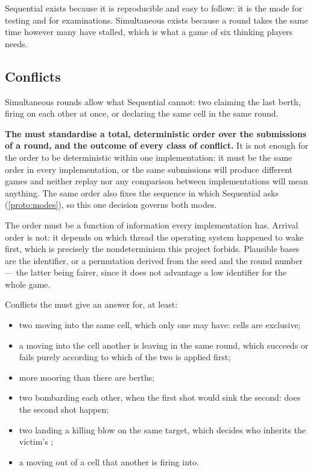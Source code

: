\documentclass{article}
\begin{document}
Sequential exists because it is reproducible and easy to follow: it is the mode for testing and for
examinations. Simultaneous exists because a round takes the same time however many \ships have
stalled, which is what a game of six thinking players needs.

\subsection{Conflicts}
\label{proto:conflicts}

Simultaneous rounds allow what Sequential cannot: two \ships claiming the last berth, firing on
each other at once, or declaring the same cell in the same round.

\textbf{The \WG{} must standardise a total, deterministic order over the submissions of a round,
and the outcome of every class of conflict.} It is not enough for the order to be deterministic
within one implementation: it must be the same order in every implementation, or the same
submissions will produce different games and neither replay nor any comparison between
implementations will mean anything. The same order also fixes the sequence in which Sequential
asks (\cref{proto:modes}), so this one decision governs both modes.

The order must be a function of information every implementation has. Arrival order is not: it
depends on which thread the operating system happened to wake first, which is precisely the
nondeterminism this project forbids. Plausible bases are the \ship{} identifier, or a permutation
derived from the seed and the round number --- the latter being fairer, since it does not advantage
a low identifier for the whole game.

Conflicts the \WG{} must give an answer for, at least:

\begin{itemize}
    \item two \ships moving into the same cell, which only one may have: cells are exclusive;
    \item a \ship{} moving into the cell another \ship{} is leaving in the same round, which
      succeeds or fails purely according to which of the two is applied first;
    \item more \ships mooring than there are berths;
    \item two \ships bombarding each other, when the first shot would sink the second: does the
      second shot happen;
    \item two \ships landing a killing blow on the same target, which decides who inherits the
      victim's \clues{};
    \item a \ship{} moving out of a cell that another \ship{} is firing into.
\end{itemize}
\end{document}
